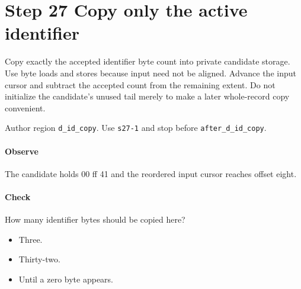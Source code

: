 \section{Step 27 Copy only the active identifier}\label{cbor-s27}
Copy exactly the accepted identifier byte count into private candidate storage. Use byte loads and stores because input need not be aligned. Advance the input cursor and subtract the accepted count from the remaining extent. Do not initialize the candidate's unused tail merely to make a later whole-record copy convenient.

Author region \texttt{d\_id\_copy}. Use \texttt{s27-1} and stop before \texttt{after\_d\_id\_copy}.

\paragraph{Observe} The candidate holds 00 ff 41 and the reordered input cursor reaches offset eight.

\paragraph{Check} How many identifier bytes should be copied here?
\begin{itemize}
  \item[A.] Three.
  \item[B.] Thirty-two.
  \item[C.] Until a zero byte appears.
\end{itemize}

